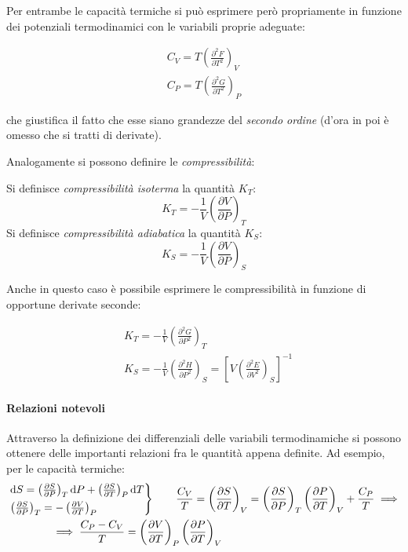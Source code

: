 Per entrambe le capacità termiche si può esprimere però propriamente in funzione dei potenziali termodinamici con le variabili proprie adeguate:

\begin{align*}
C_V = T \left(\frac{\partial^2 F}{\partial T^2}\right)_V\\
C_P = T \left(\frac{\partial^2 G}{\partial T^2}\right)_P
\end{align*}

\noindent che giustifica il fatto che esse siano grandezze del \textit{secondo ordine} (d'ora in poi è omesso che si tratti di derivate).
\newline

Analogamente si possono definire le \textit{compressibilità}:

\begin{defn}[Compressibilità]
	Si definisce \textit{compressibilità isoterma} la quantità $K_T$:
	\begin{equation*}
	K_T = - \frac{1}{V} \left(\frac{\partial V}{\partial P}\right)_T
	\end{equation*}
	Si definisce \textit{compressibilità adiabatica} la quantità $K_S$:
	\begin{equation*}
	K_S = - \frac{1}{V} \left(\frac{\partial V}{\partial P}\right)_S
	\end{equation*}
\end{defn}

Anche in questo caso è possibile esprimere le compressibilità in funzione di opportune derivate seconde:

\begin{align*}
&K_T = - \frac{1}{V} \left(\frac{\partial^2 G}{\partial P^2}\right)_T\\
&K_S = - \frac{1}{V} \left(\frac{\partial^2 H}{\partial P^2}\right)_S = \left[ V \left(\frac{\partial^2 E}{\partial V^2}\right)_S \right]^{-1}
\end{align*}

\paragraph{Relazioni notevoli} Attraverso la definizione dei differenziali delle variabili termodinamiche si possono ottenere delle importanti relazioni fra le quantità appena definite.
Ad esempio, per le capacità termiche:
\begin{align*}
&\begin{rcases*}
\dd S = \left(\frac{\partial S}{\partial P}\right)_T \dd P + \left(\frac{\partial S}{\partial T}\right)_P \dd T\\
\left(\frac{\partial S}{\partial P}\right)_T = - \left(\frac{\partial V}{\partial T}\right)_P
\end{rcases*}
\qquad \frac{C_V}{T} = \left(\frac{\partial S}{\partial T}\right)_V = \left(\frac{\partial S}{\partial P}\right)_T \left(\frac{\partial P}{\partial T}\right)_V + \frac{C_P}{T} \implies\\
&\qquad \qquad \implies \frac{C_P - C_V}{T} = \left(\frac{\partial V}{\partial T}\right)_P \left(\frac{\partial P}{\partial T}\right)_V
\end{align*}

